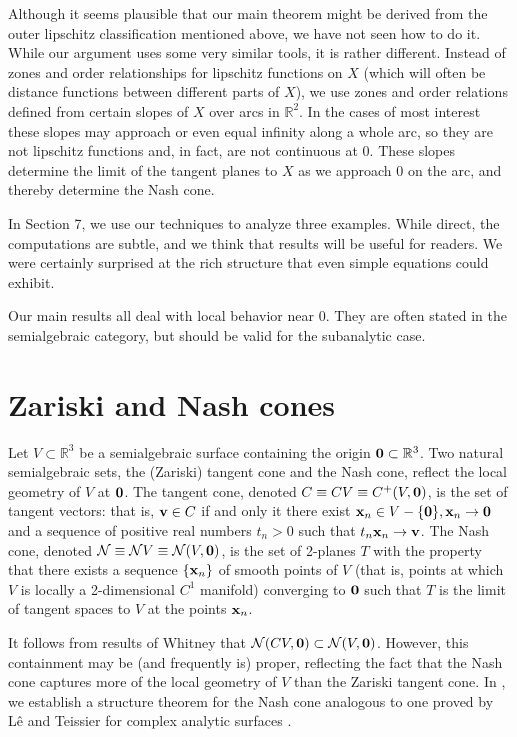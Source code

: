 \documentclass[article]{amsart}
\newcommand{\N}{\mathcal N}
\newcommand{\R}{\mathbb R}
\newcommand{\0}{{\bf 0}}
\newcommand{\x}{{\bf x}}
\newcommand{\bv}{{\bf v}}
\begin{document}
Although it seems plausible that our main theorem might be derived from the outer lipschitz classification mentioned above, we have not seen how to do it.  While our argument uses some very similar tools, it is rather different.  Instead of zones and order relationships for lipschitz functions on $X$ (which will often be distance functions between different parts of $X$), we use zones and order relations defined from certain slopes of $X$ over arcs in $\R^2$. In the cases of most interest these slopes may approach or even equal infinity along a whole arc, so they are not lipschitz functions and, in fact, are not continuous at $0$.   These slopes determine the limit of the tangent planes to $X$ as we approach $0$ on the arc, and thereby determine the Nash cone. 

In Section 7, we use our techniques to analyze three examples.  While direct, the computations are subtle, and we think that results will be useful for readers. We were certainly surprised at the rich structure that even simple equations could exhibit.  

Our main results all deal with local behavior near 0. They are often stated in the semialgebraic category, but should be valid for the subanalytic case.

\section{Zariski and Nash cones}

Let $V\subset\R^3$ be a semialgebraic surface containing the origin ${\bf 0}\subset\R^3$. Two natural semialgebraic sets, the (Zariski) tangent cone and the Nash cone, reflect the local geometry of $V$ at $\0$.  The tangent cone, denoted $C \equiv CV \equiv C^+(V, {\bf 0})$, is the set of tangent vectors: that is, $\bv \in C$ if and only it there exist $\x_n \in V - \{\0\}, \x_n \rightarrow \0$ and a sequence of positive real numbers $t_n > 0$ such that $t_n\x_n \rightarrow \bv$.  The Nash cone,  denoted $\N\equiv \N V \equiv \N(V, \0)$, is the set of 2-planes $T$ with the property that there exists a sequence $\{ \x_n\}$ of smooth points of $V$ (that is, points at which $V$ is locally a 2-dimensional $C^1$ manifold) converging to $\0$ such that $T$ is the limit of tangent spaces to $V$ at the points $\x_n$. 

It follows from results of Whitney \cite{W} that $\N(CV, \0) \subset \N (V, \0)$. However, this containment may be (and frequently is) proper, reflecting the fact that the Nash cone captures more of the local geometry of $V$ than the Zariski tangent cone.  In \cite{OW}, we establish a structure theorem for the Nash cone analogous to one proved by L{\^ e} and Teissier for complex analytic surfaces \cite{LT}.
\end{document}
